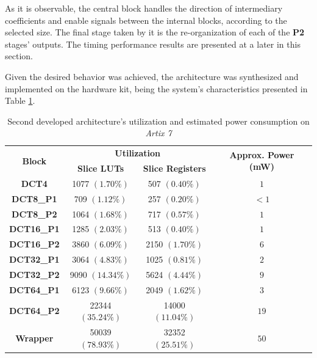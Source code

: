 As it is observable, the central block handles the direction of intermediary coefficients and enable signals between the internal blocks, according to the selected size. The final stage taken by it is the re-organization of each of the \textbf{P2} stages' outputs. The timing performance results are presented at a later in this section.

Given the desired behavior was achieved, the architecture was synthesized and implemented on the hardware kit, being the system's characteristics presented in Table \ref{tab:v2results}.

\begin{table}[!htpb]
    \centering
    \begin{tabular}{cccc} \toprule
        \multirow{2}{*}{\textbf{Block}}     & \multicolumn{2}{c}{\textbf{Utilization}}              & \multirow{2}{*}{\textbf{Approx. Power (mW)}}   \\
                                            & \textbf{Slice LUTs}      & \textbf{Slice Registers}   &                                                \\ \toprule
        \textbf{DCT4}                       & 1077 $(1.70\%)$          & 507 $(0.40\%)$             & $1$ \\
        \textbf{DCT8\_P1}                   & 709 $(1.12\%)$           & 257 $(0.20\%)$             & $<1$ \\
        \textbf{DCT8\_P2}                   & 1064 $(1.68\%)$          & 717 $(0.57\%)$             & $1$ \\
        \textbf{DCT16\_P1}                  & 1285 $(2.03\%)$          & 513 $(0.40\%)$             & $1$ \\
        \textbf{DCT16\_P2}                  & 3860 $(6.09\%)$          & 2150 $(1.70\%)$            & $6$ \\
        \textbf{DCT32\_P1}                  & 3064 $(4.83\%)$          & 1025 $(0.81\%)$            & $2$ \\
        \textbf{DCT32\_P2}                  & 9090 $(14.34\%)$         & 5624 $(4.44\%)$            & $9$ \\
        \textbf{DCT64\_P1}                  & 6123 $(9.66\%)$          & 2049 $(1.62\%)$            & $3$ \\
        \textbf{DCT64\_P2}                  & 22344 $(35.24\%)$        & 14000 $(11.04\%)$          & $19$ \\ \bottomrule
        \textbf{Wrapper}                    & 50039 $(78.93\%)$        & 32352 $(25.51\%)$          & $50$ \\
        \bottomrule
    \end{tabular}
    \caption{Second developed architecture's utilization and estimated power consumption on \emph{Artix 7}}
    \label{tab:v2results}
\end{table}

